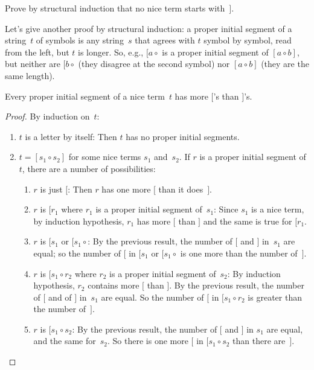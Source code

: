 \documentclass[../../../include/open-logic-section]{subfiles}
\begin{document}
\begin{prob}
  Prove by structural induction that no nice term starts with~$]$.
\end{prob}

Let's give another proof by structural induction: a proper initial
segment of a string~$t$ of symbols is any string~$s$ that agrees with
$t$ symbol by symbol, read from the left, but $t$ is longer. So,
e.g., $[a \circ {}$ is a proper initial segment of $[a \circ b]$, but
neither are $[b \circ {}$ (they disagree at the second symbol) nor $[a
\circ b]$ (they are the same length).

\begin{prop}
  Every proper initial segment of a nice term~$t$ has more $[$'s than
    $]$'s.
\end{prop}

\begin{proof}
  By induction on~$t$:
  \begin{enumerate}
  \item $t$ is a letter by itself: Then $t$ has no proper initial segments.
  \item $t = [s_1 \circ s_2]$ for some nice terms $s_1$ and~$s_2$. If $r$ is
    a proper initial segment of $t$, there are a number of
    possibilities:
    \begin{enumerate}
    \item $r$ is just $[$: Then $r$ has one more $[$ than it does~$]$.
    \item $r$ is $[r_1$ where $r_1$ is a proper initial segment
      of~$s_1$: Since $s_1$ is a nice term, by induction hypothesis, $r_1$
      has more $[$ than $]$ and the same is true for $[r_1$.
    \item $r$ is $[s_1$ or $[s_1 \circ {}$: By the previous result, the
      number of $[$ and $]$ in~$s_1$ are equal; so the number of $[$
      in $[s_1$ or $[s_1 \circ {}$ is one more than the number of~$]$.
    \item $r$ is $[s_1 \circ r_2$ where $r_2$ is a proper initial segment
      of~$s_2$:  By induction hypothesis, $r_2$ contains more $[$ than
      $]$. By the previous result, the number of $[$ and of
      $]$ in~$s_1$ are equal. So the number of $[$ in $[s_1 \circ r_2$
      is greater than the number of~$]$.
    \item $r$ is $[s_1 \circ s_2$: By the previous result, the number of
      $[$ and $]$ in $s_1$ are equal, and the same for~$s_2$. So there
      is one more $[$ in $[s_1 \circ s_2$ than there are~$]$.
    \end{enumerate}
  \end{enumerate}
\end{proof}
\end{document}
